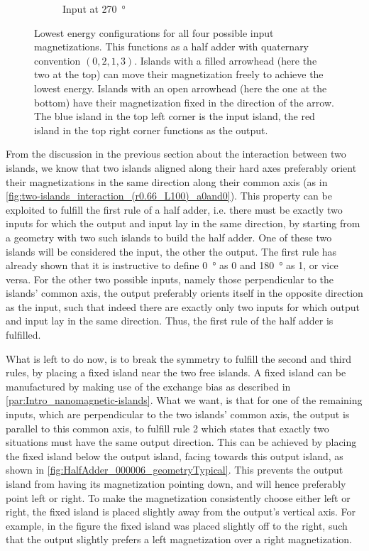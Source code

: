 \documentclass[11pt,a4paper,english]{article}
\begin{document}
\begin{figure}
\begin{subfigure}[t]{0.23\textwidth}
    \caption{Input at \SI{270}{\degree}}
\end{subfigure}
\caption{Lowest energy configurations for all four possible input magnetizations. This functions as a half adder with quaternary convention $(0,2,1,3)$. Islands with a filled arrowhead (here the two at the top) can move their magnetization freely to achieve the lowest energy. Islands with an open arrowhead (here the one at the bottom) have their magnetization fixed in the direction of the arrow. The blue island in the top left corner is the input island, the red island in the top right corner functions as the output.}
\label{fig:HalfAdder_000006_configurations_In1_0213}
\end{figure}

From the discussion in the previous section about the interaction between two islands, we know that two islands aligned along their hard axes preferably orient their magnetizations in the same direction along their common axis (as in \cref{fig:two-islands_interaction_(r0.66_L100)_a0and0}). This property can be exploited to fulfill the first rule of a half adder, i.e. there must be exactly two inputs for which the output and input lay in the same direction, by starting from a geometry with two such islands to build the half adder. One of these two islands will be considered the input, the other the output. The first rule has already shown that it is instructive to define \SI{0}{\degree} as 0 and \SI{180}{\degree} as 1, or vice versa. For the other two possible inputs, namely those perpendicular to the islands' common axis, the output preferably orients itself in the opposite direction as the input, such that indeed there are exactly only two inputs for which output and input lay in the same direction. Thus, the first rule of the half adder is fulfilled. \par
What is left to do now, is to break the symmetry to fulfill the second and third rules, by placing a fixed island near the two free islands. A fixed island can be manufactured by making use of the exchange bias as described in \cref{par:Intro_nanomagnetic-islands}. What we want, is that for one of the remaining inputs, which are perpendicular to the two islands' common axis, the output is parallel to this common axis, to fulfill rule 2 which states that exactly two situations must have the same output direction. This can be achieved by placing the fixed island below the output island, facing towards this output island, as shown in \cref{fig:HalfAdder_000006_geometryTypical}. This prevents the output island from having its magnetization pointing down, and will hence preferably point left or right. To make the magnetization consistently choose either left or right, the fixed island is placed slightly away from the output's vertical axis. For example, in the figure the fixed island was placed slightly off to the right, such that the output slightly prefers a left magnetization over a right magnetization. \par
\end{document}
